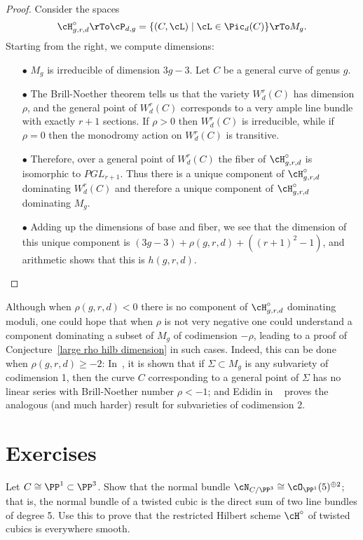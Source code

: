 \begin{proof}
Consider the spaces
$$
\cH^\circ_{g,r,d}  
\rTo 
\cP_{d,g} = \{(C,\cL) \mid \cL \in \Pic_d(C) \} 
\rTo 
M_g.
$$
Starting from the right, we compute dimensions:

\begin{enumerate}

\item[$\bullet$]  $M_g$ is irreducible of dimension $3g-3$. Let $C$ be a general curve of genus $g$.

\item[$\bullet$]  
The Brill-Noether theorem tells us that the variety $W^r_d(C)$ has dimension $\rho$, and the general point of $W^r_d(C)$ corresponds to a very ample line bundle with exactly $r+1$ sections. 
If $\rho>0$ then $W^r_d(C)$ is irreducible, while if $\rho = 0$ then the monodromy action on $W^r_d(C)$
is transitive.

\item[$\bullet$] Therefore, over a general point of $W^r_d(C)$ the fiber of $\cH^\circ_{g,r,d} $ is
isomorphic to $PGL_{r+1}$. Thus there is a unique component of $\cH^\circ_{g,r,d}$ dominating
$W^r_d(C)$ and therefore a unique component of $\cH^\circ_{g,r,d}$ dominating $M_g$.

\item[$\bullet$] Adding up the dimensions of base and fiber, we see that the dimension
of this unique component is $(3g-3)+\rho(g,r,d) +((r+1)^2-1)$,
and arithmetic shows that this is $h(g,r,d)$.
\end{enumerate}
\end{proof}

\begin{fact}\label{Hilb with rho geq -2}
 Although when $\rho(g,r,d)<0$ there is no component of $\cH^{\circ}_{g,r,d}$ dominating moduli, one could hope
that when $\rho$ is not very negative one could understand a component dominating a subset of $M_{g}$ of codimension $-\rho$, leading to a proof of Conjecture~\ref{large rho hilb dimension} in such cases.
Indeed, this can be done when $\rho(g,r,d)\geq -2$: In~\cite{BrillNoether-1}, it is shown that if $\Sigma \subset M_g$ is any subvariety of codimension 1, then the curve $C$ corresponding to a general point of $\Sigma$ has no linear series with Brill-Noether number $\rho < -1$; and Edidin in ~\cite{Edidin} proves the analogous (and much harder) result for subvarieties of codimension 2.
\end{fact}


\section{Exercises}
\begin{exercise}\label{twisted cubic normal bundle}
Let $C \cong \PP^1 \subset \PP^3$. Show that the normal bundle $\cN_{C/\PP^3} \cong \cO_{\PP^1}(5)^{\oplus 2}$; that is, the normal bundle of a twisted cubic is the direct sum of two line bundles of degree 5. Use this to prove that the restricted Hilbert scheme $\cH^\circ$ of twisted cubics is everywhere smooth. \end{exercise}

